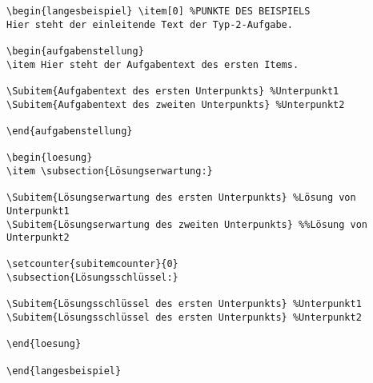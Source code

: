 \documentclass[a4paper,12pt]{article}
\begin{document}
\begin{verbatim}
\begin{langesbeispiel} \item[0] %PUNKTE DES BEISPIELS
Hier steht der einleitende Text der Typ-2-Aufgabe.

\begin{aufgabenstellung}
\item Hier steht der Aufgabentext des ersten Items.

\Subitem{Aufgabentext des ersten Unterpunkts} %Unterpunkt1
\Subitem{Aufgabentext des zweiten Unterpunkts} %Unterpunkt2

\end{aufgabenstellung}

\begin{loesung}
\item \subsection{Lösungserwartung:} 

\Subitem{Lösungserwartung des ersten Unterpunkts} %Lösung von Unterpunkt1
\Subitem{Lösungserwartung des zweiten Unterpunkts} %%Lösung von Unterpunkt2

\setcounter{subitemcounter}{0}
\subsection{Lösungsschlüssel:}
 
\Subitem{Lösungsschlüssel des ersten Unterpunkts} %Unterpunkt1
\Subitem{Lösungsschlüssel des ersten Unterpunkts} %Unterpunkt2

\end{loesung}

\end{langesbeispiel}
\end{verbatim}
\end{document}
